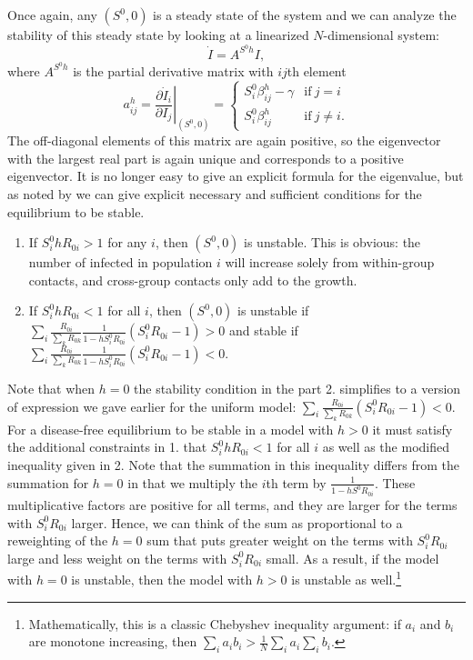 \documentclass[11pt]{article}
\begin{document}
Once again, any $(S^0, 0)$ is a steady state of the system and we can analyze the stability of this steady state by looking
at a linearized $N$-dimensional system:
$$
\dot{I} = A^{S^0 h} I,
$$
where $A^{S^0 h}$ is the partial derivative matrix with $ij$th element 
$$
a^h_{ij} = \left. \frac{\partial \dot{I}_i}{\partial I_j}\right|_{(S^0, 0)} = \left\{ \begin{array}{ll}
  S^0_i \beta^h_{ij} - \gamma & \mbox{if} \ j=i \\
  S^0_i \beta^h_{ij}                 & \mbox{if} \ j \neq i. 
  \end{array} \right.
$$
The off-diagonal elements of this matrix are again positive, so the eigenvector with the largest real part is again unique
and corresponds to a positive eigenvector. It is no longer easy to give an explicit formula for the eigenvalue, but as noted by
\citet{diekmann1990definition, dushoff1995effects} we can give explicit necessary and sufficient conditions for the equilibrium to be stable. 

\begin{enumerate}
\item
If $S^0_i h R_{0i} > 1$ for any $i$, then $(S^0, 0)$ is unstable. This is obvious: the number of infected in population $i$ will increase solely from within-group contacts, and cross-group contacts only add to the growth.

\item
If $S^0_i h R_{0i} < 1$ for all $i$, then $(S^0, 0)$ is unstable if $\sum_i \frac{R_{0i}}{\sum_k R_{0k}} \frac{1}{1-h S^0_i R_{0i}} (S^0_i R_{0i} - 1)> 0$ and stable if $\sum_i \frac{R_{0i}}{\sum_k R_{0k}} \frac{1}{1-h S^0_i R_{0i}} (S^0_i R_{0i} - 1) < 0.$
\end{enumerate}

Note that when $h=0$ the stability condition in the part 2. simplifies to a version of expression we gave
earlier for the uniform model: 
$\sum_i \frac{R_{0i}}{\sum_k R_{0k}} (S^0_i R_{0i} - 1) < 0$. For a disease-free equilibrium to be stable in a model with $h>0$ it must satisfy the additional constraints in 1. that $S^0_i h R_{0i} < 1$ for all $i$ as well as the modified inequality given in 2. Note that the summation in this inequality differs from the summation for $h=0$ in that we multiply the $i$th term by $\frac{1}{1-hS^0 R_{0i}}$. These multiplicative factors are positive for all terms, and they are larger for the terms  with $S^0_i R_{0i}$ larger. Hence, we can think of the sum as proportional to a reweighting of the $h=0$ sum that puts greater weight on the terms with $S^0_i R_{0i}$
large and less weight on the terms with $S^0_i R_{0i}$ small. As a result, if the model with $h=0$ is unstable, then the model with $h>0$ is unstable as well.\footnote{Mathematically, this is a 
classic Chebyshev inequality argument: if $a_i$ and $b_i$ are monotone increasing, then $\sum_i a_i b_i > \frac{1}{N} \sum_i a_i \sum_i b_i$.}
\end{document}
